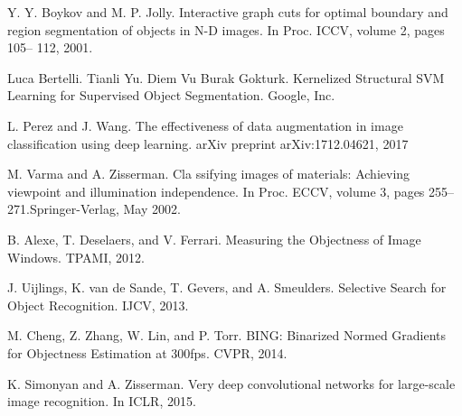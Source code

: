 \documentclass[12pt]{report}
\begin{document}
\begin{thebibliography}{9}
			Y. Y. Boykov and M. P. Jolly. Interactive graph cuts for optimal boundary and region segmentation of objects in N-D images. In Proc. ICCV, volume 2, pages 105– 112, 2001.
																																																																																															
			Luca Bertelli. Tianli Yu. Diem Vu Burak Gokturk. Kernelized Structural SVM Learning for Supervised Object Segmentation. Google, Inc.
																																																		
			L. Perez and J. Wang. The effectiveness of data augmentation in image classification using deep learning. arXiv preprint arXiv:1712.04621, 2017
																																																																																										
			M. Varma and A. Zisserman. Cla	ssifying images of materials: Achieving viewpoint and illumination independence. In Proc. ECCV, volume 3, pages 255–271.Springer-Verlag, May 2002.	
																																																																																													
			B. Alexe, T. Deselaers, and V. Ferrari. Measuring the Objectness of Image Windows. TPAMI, 2012.
																																																																																										
			J. Uijlings, K. van de Sande, T. Gevers, and A. Smeulders. Selective Search for Object Recognition. IJCV, 2013.
																																																																																										
			M. Cheng, Z. Zhang, W. Lin, and P. Torr. BING: Binarized Normed Gradients for Objectness Estimation at 300fps. CVPR, 2014.
																																																																																										
			K. Simonyan and A. Zisserman. Very deep convolutional networks for large-scale image recognition. In ICLR, 2015.
																																																																																										

\end{thebibliography}
\end{document}
